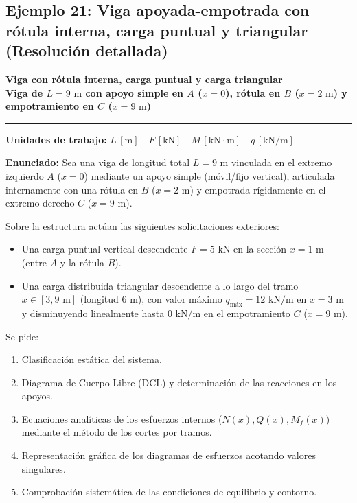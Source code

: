 \subsection{Ejemplo 21: Viga apoyada-empotrada con rótula interna, carga puntual y triangular (Resolución detallada)}

\begin{tcolorbox}[colback=blue!3!white, colframe=blue!40!black, arc=3pt, boxrule=0.8pt, left=8pt, right=8pt, top=6pt, bottom=6pt]
    \centering
    {\Large\bfseries\color{blue!60!black} Viga con rótula interna, carga puntual y carga triangular}\\[2pt]
    {\normalsize\bfseries Viga de $L = 9\text{ m}$ con apoyo simple en $A$ ($x=0$), rótula en $B$ ($x=2\text{ m}$) y empotramiento en $C$ ($x=9\text{ m}$)}

    \vspace{4pt}\hrule\vspace{4pt}
    {\small\textbf{Unidades de trabajo:} $L\,[\text{m}] \quad F\,[\text{kN}] \quad M\,[\text{kN}\cdot\text{m}] \quad q\,[\text{kN/m}]$}
\end{tcolorbox}

\textbf{Enunciado:}
Sea una viga de longitud total $L = 9\text{ m}$ vinculada en el extremo izquierdo $A$ ($x=0$) mediante un apoyo simple (móvil/fijo vertical), articulada internamente con una rótula en $B$ ($x = 2\text{ m}$) y empotrada rígidamente en el extremo derecho $C$ ($x = 9\text{ m}$). 

Sobre la estructura actúan las siguientes solicitaciones exteriores:
\begin{itemize}
    \item Una carga puntual vertical descendente $F = 5\text{ kN}$ en la sección $x = 1\text{ m}$ (entre $A$ y la rótula $B$).
    \item Una carga distribuida triangular descendente a lo largo del tramo $x \in [3, 9\text{ m}]$ (longitud $6\text{ m}$), con valor máximo $q_{\text{máx}} = 12\text{ kN/m}$ en $x = 3\text{ m}$ y disminuyendo linealmente hasta $0\text{ kN/m}$ en el empotramiento $C$ ($x = 9\text{ m}$).
\end{itemize}

Se pide:
\begin{enumerate}[label=(\alph*)]
    \item Clasificación estática del sistema.
    \item Diagrama de Cuerpo Libre (DCL) y determinación de las reacciones en los apoyos.
    \item Ecuaciones analíticas de los esfuerzos internos ($N(x), Q(x), M_f(x)$) mediante el método de los cortes por tramos.
    \item Representación gráfica de los diagramas de esfuerzos acotando valores singulares.
    \item Comprobación sistemática de las condiciones de equilibrio y contorno.
\end{enumerate}

